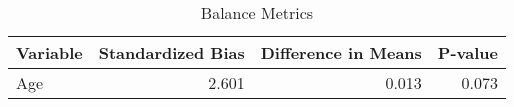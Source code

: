 \begin{table}[!h]
\centering
\caption{Balance Metrics}
\centering
\begin{tabular}[t]{lrrr}
\toprule
Variable & Standardized Bias & Difference in Means & P-value\\
\midrule
Age & 2.601 & 0.013 & 0.073\\
\bottomrule
\end{tabular}
\end{table}
